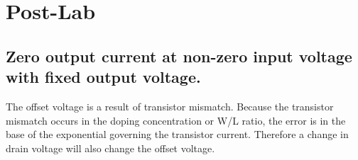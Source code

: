 

\newcommand{\reffig}[1]{Fig.~\ref{#1}}



\newpage
\section{Post-Lab}
\subsection{Zero output current at non-zero input voltage with fixed output voltage.}
The offset voltage is a result of transistor mismatch. Because the transistor mismatch
occurs in the doping concentration or W/L ratio, the error is in the base of the exponential
governing the transistor current. Therefore a change in drain voltage will also change
the offset voltage.

